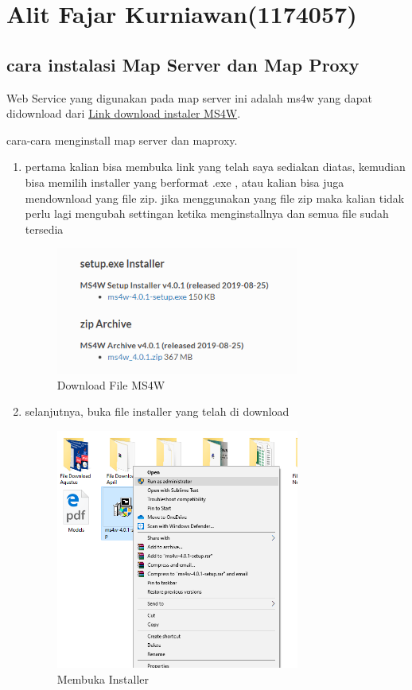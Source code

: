 \section{Alit Fajar Kurniawan(1174057)}
\subsection{cara instalasi Map Server dan Map Proxy}
Web Service yang digunakan pada map server ini adalah ms4w yang dapat didownload dari \href{https://ms4w.com/download.html#download}{Link download instaler MS4W}.

cara-cara menginstall map server dan maproxy.
\begin{enumerate}
    \item pertama kalian bisa membuka link yang telah saya sediakan diatas, kemudian bisa memilih installer yang berformat .exe , atau kalian bisa juga mendownload yang file zip. jika menggunakan yang file zip maka kalian tidak perlu lagi mengubah settingan ketika menginstallnya dan semua file sudah tersedia
    \hfill\break
	\begin{figure}[H]
		\includegraphics[width=8cm]{figures/1174057/Tugas4satu.png}
		\centering
		\caption{Download File MS4W}
	\end{figure}

	\item selanjutnya, buka file installer yang telah di download
    \hfill\break
	\begin{figure}[H]
		\includegraphics[width=8cm]{figures/1174057/Tugas4dua.PNG}
		\centering
		\caption{Membuka Installer}
	\end{figure}


\end{enumerate}
